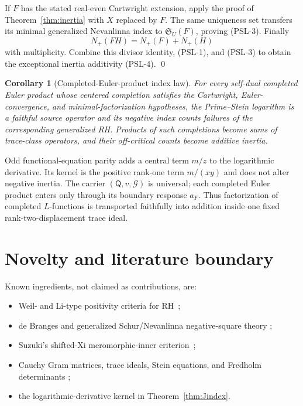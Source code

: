 \documentclass[11pt]{article}
\newtheorem{corollary}[theorem]{Corollary}
\theoremstyle{definition}
\theoremstyle{remark}
\newcommand{\cG}{\mathcal G}
\begin{document}
If $F$ has the stated real-even Cartwright extension, apply the proof of
Theorem~\ref{thm:inertia} with $X$ replaced by $F$.  The same uniqueness set transfers its minimal
generalized Nevanlinna index to $\mathfrak S_U(F)$, proving (PSL-3).  Finally
\[
 N_+(FH)=N_+(F)+N_+(H)
\]
with multiplicity.  Combine this divisor identity, (PSL-1), and (PSL-3) to obtain the exceptional
inertia additivity (PSL-4). \qed

\begin{corollary}[Completed-Euler-product index law]
\label{cor:universal}
For every self-dual completed Euler product whose centered completion satisfies the Cartwright,
Euler-convergence, and minimal-factorization hypotheses, the Prime--Stein logarithm is a faithful
source operator and its negative index counts failures of the corresponding generalized RH.
Products of such completions become sums of trace-class operators, and their off-critical counts
become additive inertia.
\end{corollary}

Odd functional-equation parity adds a central term $m/z$ to the logarithmic derivative.  Its
kernel is the positive rank-one term $m/(xy)$ and does not alter negative inertia.  The carrier
$(\mathsf Q,v,\cG)$ is universal; each completed Euler product enters only through its boundary
response $a_F$.  Thus factorization of completed $L$-functions is transported faithfully into
addition inside one fixed rank-two-displacement trace ideal.

\section{Novelty and literature boundary}
\label{sec:novelty}

Known ingredients, not claimed as contributions, are:
\begin{itemize}
\item Weil- and Li-type positivity criteria for RH~\cite{Weil1952,Li1997};
\item de Branges and generalized Schur/Nevanlinna negative-square theory
      \cite{deBranges1968,AlpayRovnyak1999};
\item Suzuki's shifted-Xi meromorphic-inner criterion~\cite{Suzuki2012};
\item Cauchy Gram matrices, trace ideals, Stein equations, and Fredholm determinants
      \cite{Aronszajn1950,Simon2005};
\item the logarithmic-derivative kernel in Theorem~\ref{thm:Jindex}.
\end{itemize}
\end{document}
